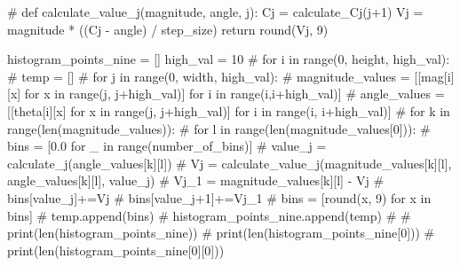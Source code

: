 \documentclass[
  letterpaper,
]{report}
\newenvironment{Shaded}{\begin{snugshade}}{\end{snugshade}}
\newcommand{\BuiltInTok}[1]{\textcolor[rgb]{0.00,0.23,0.31}{#1}}
\newcommand{\CommentTok}[1]{\textcolor[rgb]{0.37,0.37,0.37}{#1}}
\newcommand{\ControlFlowTok}[1]{\textcolor[rgb]{0.00,0.23,0.31}{#1}}
\newcommand{\DecValTok}[1]{\textcolor[rgb]{0.68,0.00,0.00}{#1}}
\newcommand{\KeywordTok}[1]{\textcolor[rgb]{0.00,0.23,0.31}{#1}}
\newcommand{\NormalTok}[1]{\textcolor[rgb]{0.00,0.23,0.31}{#1}}
\newcommand{\OperatorTok}[1]{\textcolor[rgb]{0.37,0.37,0.37}{#1}}
\begin{document}
\begin{Shaded}
\begin{Highlighting}[]
\CommentTok{\# }
\KeywordTok{def}\NormalTok{ calculate\_value\_j(magnitude, angle, j):}
\NormalTok{  Cj }\OperatorTok{=}\NormalTok{ calculate\_Cj(j}\OperatorTok{+}\DecValTok{1}\NormalTok{)}
\NormalTok{  Vj }\OperatorTok{=}\NormalTok{ magnitude }\OperatorTok{*}\NormalTok{ ((Cj }\OperatorTok{{-}}\NormalTok{ angle) }\OperatorTok{/}\NormalTok{ step\_size)}
  \ControlFlowTok{return} \BuiltInTok{round}\NormalTok{(Vj, }\DecValTok{9}\NormalTok{)}
\end{Highlighting}
\end{Shaded}

\begin{Shaded}
\begin{Highlighting}[]
\NormalTok{histogram\_points\_nine }\OperatorTok{=}\NormalTok{ []}
\NormalTok{high\_val }\OperatorTok{=} \DecValTok{10}
\CommentTok{\# for i in range(0, height, high\_val):}
\CommentTok{\#   temp = []}
\CommentTok{\#   for j in range(0, width, high\_val):}
\CommentTok{\#     magnitude\_values = [[mag[i][x] for x in range(j, j+high\_val)] for i in range(i,i+high\_val)]}
\CommentTok{\#     angle\_values = [[theta[i][x] for x in range(j, j+high\_val)] for i in range(i, i+high\_val)]}
\CommentTok{\#     for k in range(len(magnitude\_values)):}
\CommentTok{\#       for l in range(len(magnitude\_values[0])):}
\CommentTok{\#         bins = [0.0 for \_ in range(number\_of\_bins)]}
\CommentTok{\#         value\_j = calculate\_j(angle\_values[k][l])}
\CommentTok{\#         Vj = calculate\_value\_j(magnitude\_values[k][l], angle\_values[k][l], value\_j)}
\CommentTok{\#         Vj\_1 = magnitude\_values[k][l] {-} Vj}
\CommentTok{\#         bins[value\_j]+=Vj}
\CommentTok{\#         bins[value\_j+1]+=Vj\_1}
\CommentTok{\#         bins = [round(x, 9) for x in bins]}
\CommentTok{\#     temp.append(bins)}
\CommentTok{\#   histogram\_points\_nine.append(temp)}
\CommentTok{\# }
\CommentTok{\# print(len(histogram\_points\_nine))}
\CommentTok{\# print(len(histogram\_points\_nine[0]))}
\CommentTok{\# print(len(histogram\_points\_nine[0][0]))}
\end{Highlighting}
\end{Shaded}
\end{document}
